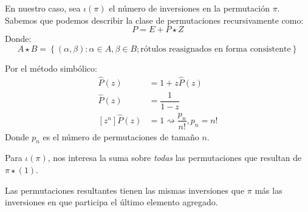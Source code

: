 \documentclass[english, spanish, fleqn, 10pt]{article}
\newcommand{\comentarioc}[1]{\texttt{\textcolor{webred}{/* #1 */}}}
\numberwithin{equation}{section}
\newcommand{\nparentesis}[1]{\left( #1 \right)}
\newcommand{\llaves}[1]{\left \{ #1 \right \}}
\newcommand{\ncorchetes}[1]{\left[ #1 \right]}
\theoremstyle{definition}
\begin{document}
En nuestro caso, sea $\iota\nparentesis{\pi}$ el número de inversiones en la permutación $\pi$. Sabemos que podemos describir la clase de permutaciones recursivamente como:
\begin{equation*}
P = E + P \star Z
\end{equation*}
Donde:
\begin{equation*}
A \star B = \llaves{\nparentesis{\alpha, \beta}: \alpha \in A, \beta \in B; \text{rótulos reasignados en forma consistente}}
\end{equation*}

Por el método simbólico:
\begin{align*}
\hat P \nparentesis{z} &= 1  + z\hat P \nparentesis{z}\\
\hat P \nparentesis{z} &= \dfrac{1}{1-z}\\
\ncorchetes{z^n} \hat P \nparentesis{z} &= 1 \rightsquigarrow \dfrac{p_n}{n!}, p_n = n!
\end{align*}
Donde $p_n$ es el número de permutaciones de tamaño $n$.

Para $\iota\nparentesis{\pi}$, nos interesa la suma sobre \emph{todas} las permutaciones que resultan de $\pi \star \nparentesis{1}$.

Las permutaciones resultantes tienen las mismas inversiones que $\pi$ más las inversiones en que participa el último elemento agregado.
\end{document}
